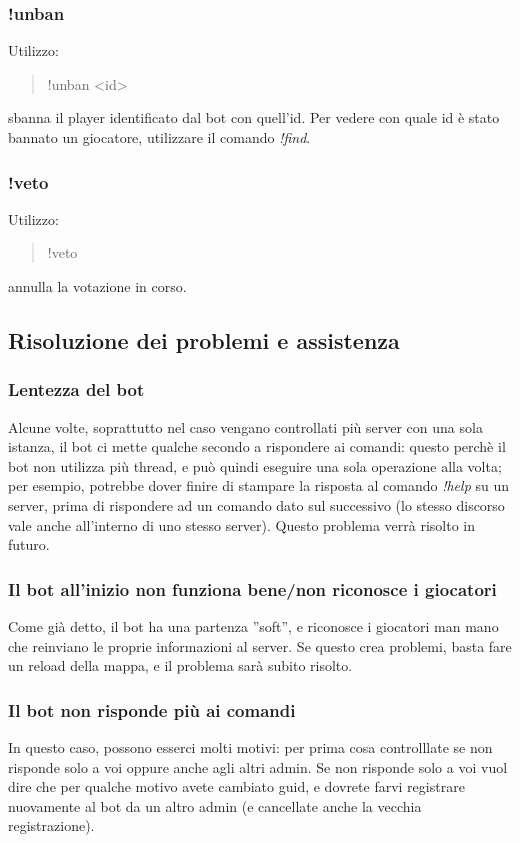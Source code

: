 \documentclass[a4paper]{article}
\begin{document}
\subsubsection{!unban}
Utilizzo:
\begin{quote}
!unban \textless{}id\textgreater{}
\end{quote}
sbanna il player identificato dal bot con quell'id. Per vedere con quale id \`e stato bannato un giocatore, utilizzare il comando \textit{!find}.

\subsubsection{!veto}
Utilizzo:
\begin{quote}
!veto
\end{quote}
annulla la votazione in corso.

\newpage
\subsection{Risoluzione dei problemi e assistenza}

\subsubsection{Lentezza del bot}
Alcune volte, soprattutto nel caso vengano controllati pi\`u server con una sola istanza, il bot ci mette qualche secondo a rispondere ai comandi: questo perch\`e il bot non utilizza pi\`u thread, e pu\`o quindi eseguire una sola operazione alla volta; per esempio, potrebbe dover finire di stampare la risposta al comando \textit{!help} su un server, prima di rispondere ad un comando dato sul successivo (lo stesso discorso vale anche all'interno di uno stesso server). Questo problema verr\`a risolto in futuro.\\

\subsubsection{Il bot all'inizio non funziona bene/non riconosce i giocatori}
Come gi\`a detto, il bot ha una partenza ''soft'', e riconosce i giocatori man mano che reinviano le proprie informazioni al server. Se questo crea problemi, basta fare un reload della mappa, e il problema sar\`a subito risolto.\\

\subsubsection{Il bot non risponde pi\`u ai comandi}
In questo caso, possono esserci molti motivi: per prima cosa controlllate se non risponde solo a voi  oppure anche agli altri admin.
Se non risponde solo a voi vuol dire che per qualche motivo avete cambiato guid, e dovrete farvi registrare nuovamente al bot da un altro admin (e cancellate anche la vecchia registrazione).
\end{document}
